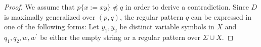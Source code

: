   \begin{proof}
  We assume that $p \{ x := xy \} \not\preceq q$ in order to derive a contradiction.
%
%
%
%
Since $D$ is maximally generalized {\color{red}over} $(p,q)$, the regular pattern $q$ can be expressed in one of the following forms: Let $y_{1}, y_{2}$ be distinct variable symbols in $X$ and $q_{1}, q_{2}, w, w^{\prime}$ be either the empty string or a regular pattern {\color{red}over} $\Sigma\cup X$.


\end{proof}
